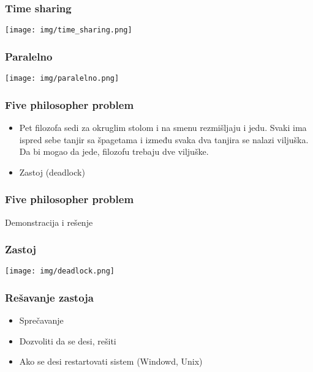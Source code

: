\documentclass{beamer}
\begin{document}
\begin{frame}
    \frametitle{Time sharing}
    \begin{center}
        \texttt{[image: img/time\_sharing.png]}
    \end{center}
\end{frame}

\begin{frame}
    \frametitle{Paralelno}
    \begin{center}
        \texttt{[image: img/paralelno.png]}
    \end{center}
\end{frame}

\begin{frame}
    \frametitle{Five philosopher problem}
    \begin{itemize}
        \item Pet filozofa sedi za okruglim stolom i na smenu rezmišljaju i jedu. 
        Svaki ima ispred sebe tanjir sa špagetama i između svaka dva tanjira se nalazi viljuška.
         Da bi mogao da jede, filozofu trebaju dve viljuške. \newline
        \item Zastoj (deadlock)
    \end{itemize}
\end{frame}

\begin{frame}
    \frametitle{Five philosopher problem}
    \begin{center}
        \large{Demonstracija i rešenje}
    \end{center}
\end{frame}

\begin{frame}
    \frametitle{Zastoj}

    \begin{center}
        \texttt{[image: img/deadlock.png]}
    \end{center}
\end{frame}

\begin{frame}
    \frametitle{Rešavanje zastoja}
    \begin{itemize}
        \item Sprečavanje \newline
        \item Dozvoliti da se desi, rešiti \newline
        \item Ako se desi restartovati sistem (Windowd, Unix)
    \end{itemize}
\end{frame}
\end{document}
